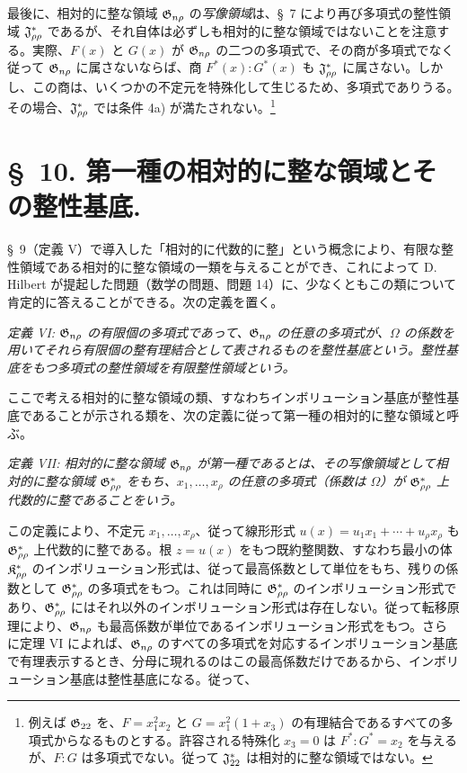 \documentclass[11pt]{jlreq}
\begin{document}
最後に、相対的に整な領域 $\mathfrak{G}_{n\rho}$ の\emph{写像領域}は、\S\ 7 により再び多項式の整性領域 $\mathfrak{J}^*_{\rho\rho}$ であるが、それ自体は必ずしも相対的に整な領域ではないことを注意する。実際、$F(x)$ と $G(x)$ が $\mathfrak{G}_{n\rho}$ の二つの多項式で、その商が多項式でなく従って $\mathfrak{G}_{n\rho}$ に属さないならば、商 $F^*(x):G^*(x)$ も $\mathfrak{J}^*_{\rho\rho}$ に属さない。しかし、この商は、いくつかの不定元を特殊化して生じるため、多項式でありうる。その場合、$\mathfrak{J}^*_{\rho\rho}$ では条件 4a) が満たされない。\footnote{例えば $\mathfrak{G}_{22}$ を、$F=x_1^2x_2$ と $G=x_1^2(1+x_3)$ の有理結合であるすべての多項式からなるものとする。許容される特殊化 $x_3=0$ は $F^*:G^*=x_2$ を与えるが、$F:G$ は多項式でない。従って $\mathfrak{J}^*_{22}$ は相対的に整な領域ではない。}

\section*{\S\ 10. 第一種の相対的に整な領域とその整性基底.}

\S\ 9（定義 V）で導入した「相対的に代数的に整」という概念により、有限な整性領域である相対的に整な領域の一類を与えることができ、これによって D. Hilbert が提起した問題（数学の問題、問題 14）に、少なくともこの類について肯定的に答えることができる。次の定義を置く。

\emph{定義 VI: $\mathfrak{G}_{n\rho}$ の有限個の多項式であって、$\mathfrak{G}_{n\rho}$ の任意の多項式が、$\Omega$ の係数を用いてそれら有限個の整有理結合として表されるものを整性基底という。整性基底をもつ多項式の整性領域を有限整性領域という。}

ここで考える相対的に整な領域の類、すなわちインボリューション基底が整性基底であることが示される類を、次の定義に従って第一種の相対的に整な領域と呼ぶ。

\emph{定義 VII: 相対的に整な領域 $\mathfrak{G}_{n\rho}$ が第一種であるとは、その写像領域として相対的に整な領域 $\mathfrak{G}^*_{\rho\rho}$ をもち、$x_1,\ldots,x_\rho$ の任意の多項式（係数は $\Omega$）が $\mathfrak{G}^*_{\rho\rho}$ 上代数的に整であることをいう。}

この定義により、不定元 $x_1,\ldots,x_\rho$、従って線形形式 $u(x)=u_1x_1+\cdots+u_\rho x_\rho$ も $\mathfrak{G}^*_{\rho\rho}$ 上代数的に整である。根 $z=u(x)$ をもつ既約整関数、すなわち最小の体 $\mathfrak{K}^*_{\rho\rho}$ のインボリューション形式は、従って最高係数として単位をもち、残りの係数として $\mathfrak{G}^*_{\rho\rho}$ の多項式をもつ。これは同時に $\mathfrak{G}^*_{\rho\rho}$ のインボリューション形式であり、$\mathfrak{G}^*_{\rho\rho}$ にはそれ以外のインボリューション形式は存在しない。従って転移原理により、$\mathfrak{G}_{n\rho}$ も最高係数が単位であるインボリューション形式をもつ。さらに定理 VI によれば、$\mathfrak{G}_{n\rho}$ のすべての多項式を対応するインボリューション基底で有理表示するとき、分母に現れるのはこの最高係数だけであるから、インボリューション基底は整性基底になる。従って、
\end{document}
